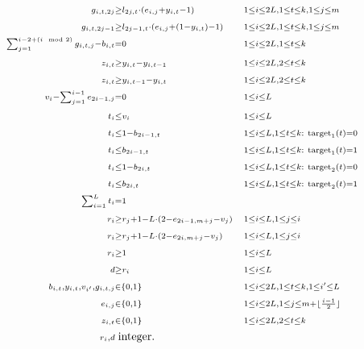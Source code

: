 \documentclass[runningheads]{llncs}
\begin{document}
\begin{align*}
  {\scriptstyle     g_{i,t,2j} }&{\scriptstyle\geq l_{2j,t}\cdot(e_{i,j}+ y_{i,t}-1) }&&{\scriptstyle 1\leq i \leq 2L, 1\leq t \leq k, 1\leq j\leq m} \\
  {\scriptstyle     g_{i,t,2j-1} }&{\scriptstyle\geq l_{2j-1,t}\cdot(e_{i,j}+ (1-y_{i,t})-1) }&&{\scriptstyle 1\leq i \leq 2L, 1\leq t \leq k, 1\leq j\leq m} \\
  {\scriptstyle     \sum_{j=1}^{i-2+(i\mod 2)} g_{i,t,j} - b_{i,t} }&{\scriptstyle=0 }&&{\scriptstyle 1\leq i \leq 2L, 1\leq t \leq k}\\
  {\scriptstyle z_{i,t} }&{\scriptstyle\geq y_{i,t}-y_{i,t-1}}&&{\scriptstyle 1\leq i \leq 2L, 2\leq t \leq k}\\
  {\scriptstyle z_{i,t} }&{\scriptstyle\geq y_{i,t-1}-y_{i,t}}&&{\scriptstyle 1\leq i \leq 2L, 2\leq t \leq k}\\
  {\scriptstyle      v_i-\sum_{j=1}^{i-1} e_{2i-1,j}}&{\scriptstyle=0}&&{\scriptstyle1\leq i \leq L}\\
   {\scriptstyle    t_i}&{\scriptstyle \leq v_i}&&{\scriptstyle 1\leq i \leq L}\\
     {\scriptstyle     t_i}&{\scriptstyle \leq 1-b_{2i-1,t} }&&{\scriptstyle 1\leq i \leq L,1\leq t \leq k: \mbox{ \scriptsize target}_1(t)=0}\\  
     {\scriptstyle     t_i}&{\scriptstyle \leq b_{2i-1,t} }&&{\scriptstyle 1\leq i \leq L,1\leq t \leq k: \mbox{ \scriptsize target}_1(t)=1}\\  
     {\scriptstyle     t_i}&{\scriptstyle \leq 1-b_{2i,t} }&&{\scriptstyle 1\leq i \leq L,1\leq t \leq k: \mbox{ \scriptsize  target}_2(t)=0}\\  
     {\scriptstyle     t_i}&{\scriptstyle \leq b_{2i,t} }&&{\scriptstyle 1\leq i \leq L,1\leq t \leq k: \mbox{ \scriptsize target}_2(t)=1}\\  
     {\scriptstyle     \sum_{i=1}^L t_i }&{\scriptstyle=1 }&& \\
   {\scriptstyle r_i }&{\scriptstyle \geq r_j+1 - L\cdot (2-e_{2i-1,m+j}-v_j)} &&{\scriptstyle 1\leq i\leq L, 1\leq j \leq i}\\
   {\scriptstyle r_i }&{\scriptstyle \geq r_j+1 - L\cdot (2-e_{2i,m+j}-v_j) }&&{\scriptstyle 1\leq i\leq L, 1\leq j \leq i}\\
    {\scriptstyle      r_i }&{\scriptstyle \geq 1 }&&{\scriptstyle 1\leq i \leq L}\\
   {\scriptstyle d }&{\scriptstyle \geq r_i }&&{\scriptstyle 1\leq i \leq L}\\
   {\scriptstyle b_{i,t}, y_{i,t}, v_{i'}, g_{i,t,j}  }&{\scriptstyle \in \{0,1\}} &&{\scriptstyle 1\leq i\leq 2L, 1\leq t \leq k, 1\leq i'\leq L \notag}\\
   {\scriptstyle e_{i,j}}& {\scriptstyle \in \{0,1\}}&&{\scriptstyle 1\leq i\leq 2L, 1\leq j\leq m+\lfloor\frac{i-1}{2} \rfloor }\notag\\
   {\scriptstyle z_{i,t} }&{\scriptstyle \in \{0,1\} }&&{\scriptstyle 1\leq i\leq 2L, 2\leq t \leq k}\notag\\
{\scriptstyle r_i, d }&\; \text{integer.}&& \notag
\end{align*}
\end{document}
